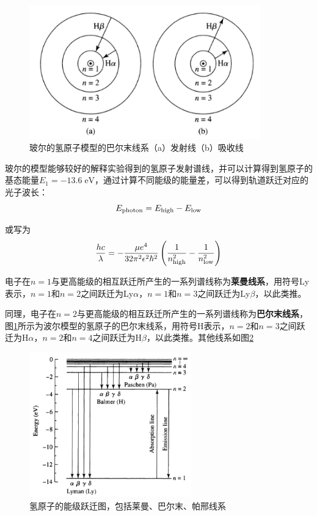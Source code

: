 \documentclass[openany]{ctexbook}
\begin{document}
\begin{figure}
  \centering
  \includegraphics[width=10cm]{chapters/05/atom}
  \caption{玻尔的氢原子模型的巴尔末线系（a）发射线（b）吸收线}
  \label{fig:atom}
\end{figure}

玻尔的模型能够较好的解释实验得到的氢原子发射谱线，并可以计算得到氢原子的基态能量$E_1=-13.6\;\mathrm{eV}$，通过计算不同能级的能量差，可以得到轨道跃迁对应的光子波长：
\begin{equation}
  E_\mathrm{photon}=E_\mathrm{high}-E_\mathrm{low}\notag
\end{equation}

或写为
\begin{equation}
  {hc \over \lambda}=-{\mu e^4\over 32\pi^2\epsilon^2\hbar^2} \left({1\over n_\mathrm{high}^2}- {1\over n_\mathrm{low}^2}\right)
\end{equation}

电子在$n=1$与更高能级的相互跃迁所产生的一系列谱线称为\textbf{莱曼线系}，用符号Ly表示，$n=1$和$n=2$之间跃迁为Ly$\alpha$，$n=1$和$n=3$之间跃迁为Ly$\beta$，以此类推。

同理，电子在$n=2$与更高能级的相互跃迁所产生的一系列谱线称为\textbf{巴尔末线系}，图\ref{fig:atom}所示为波尔模型的氢原子的巴尔末线系，用符号H表示，$n=2$和$n=3$之间跃迁为H$\alpha$，$n=2$和$n=4$之间跃迁为H$\beta$，以此类推。其他线系如图\ref{fig:level}

\begin{figure}[hbt]
  \centering
  \includegraphics[width=7cm]{chapters/05/level}
  \caption{氢原子的能级跃迁图，包括莱曼、巴尔末、帕邢线系}
  \label{fig:level}
\end{figure}
\end{document}
